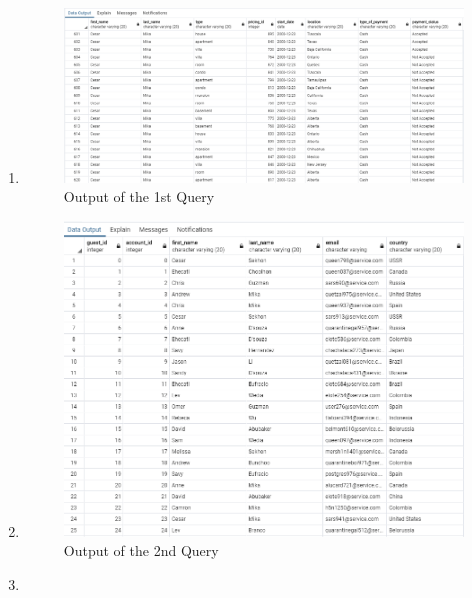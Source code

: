 \documentclass[12pt, lettersize]{article}
\theoremstyle{Remark}
\begin{document}
	\begin{enumerate}
		
		\item 
		
		
		\begin{figure}[h]
			\centering
			\includegraphics[width= \linewidth]{Query1Output.png}
			\caption{Output of the 1st Query}
		\end{figure}
		
		\newpage
		
		\item 
		
		
		\begin{figure}[h]
		\centering
		\includegraphics[width= \linewidth]{Query2Output.png}
		\caption{Output of the 2nd Query}
		\end{figure}

		\item 
		
		

\end{enumerate}
\end{document}
